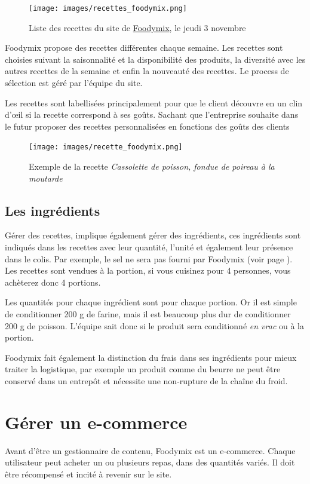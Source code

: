 \documentclass{article}
\begin{document}
\begin{figure}[h]
    \centering
    \texttt{[image: images/recettes\_foodymix.png]}
    \caption{Liste des recettes du site de \href{https://foodymix.fr/}{Foodymix}, le jeudi 3 novembre}
\end{figure}

Foodymix propose des recettes différentes chaque semaine. Les recettes sont choisies suivant la saisonnalité et la disponibilité des produits, la diversité avec les autres recettes de la semaine et enfin la nouveauté des recettes. Le process de sélection est géré par l'équipe du site.

Les recettes sont labellisées principalement pour que le client découvre en un clin d'œil si la recette correspond à ses goûts. Sachant que l'entreprise souhaite dans le futur proposer des recettes personnalisées en fonctions des goûts des clients

\begin{figure}[p]
    \centering
    \texttt{[image: images/recette\_foodymix.png]}
    \caption{Exemple de la recette \textit{Cassolette de poisson, fondue de poireau à la moutarde}}
    \label{Figure Recette Exemple}
\end{figure}

\subsection{Les ingrédients}
Gérer des recettes, implique également gérer des ingrédients, ces ingrédients sont indiqués dans les recettes avec leur quantité, l'unité et également leur présence dans le colis. Par exemple, le sel ne sera pas fourni par Foodymix (voir page ). Les recettes sont vendues à la portion, si vous cuisinez pour 4 personnes, vous achèterez donc 4 portions. 

Les quantités pour chaque ingrédient sont pour chaque portion. Or il est simple de conditionner 200 g de farine, mais il est beaucoup plus dur de conditionner 200 g de poisson. L'équipe sait donc si le produit sera conditionné \textit{en vrac} ou à la portion.

Foodymix fait également la distinction du frais dans ses ingrédients pour mieux traiter la logistique, par exemple un produit comme du beurre ne peut être conservé dans un entrepôt et nécessite une non-rupture de la chaîne du froid.
\section{Gérer un e-commerce}
Avant d'être un gestionnaire de contenu, Foodymix est un e-commerce. Chaque utilisateur peut acheter un ou plusieurs repas, dans des quantités variés. Il doit être récompensé et incité à revenir sur le site.
\end{document}
